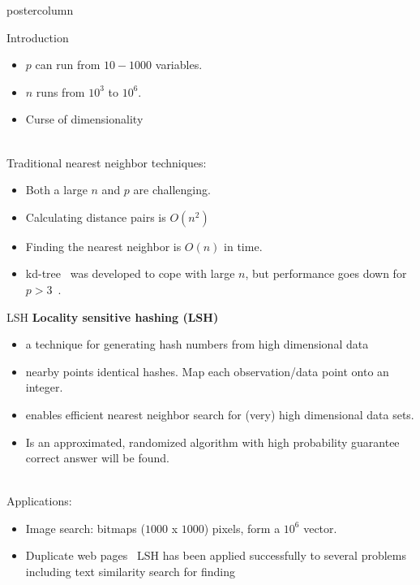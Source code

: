 \documentclass[final,hyperref={pdfpagelabels=false}]{beamer}
\begin{document}
\begin{frame}
\begin{columns}
\begin{column}{.49\textwidth}
\begin{beamercolorbox}[center,wd=\textwidth]{postercolumn}
\begin{minipage}[T]{.95\textwidth}
{\begin{block}{Introduction}
                \begin{itemize}
                \item $p$ can run from $10-1000$ variables. 
                \item $n$ runs from $10^3$ to $10^6$.
                \item Curse of dimensionality
              \end{itemize}            
            ~\\
            Traditional nearest neighbor techniques:            
              \begin{itemize}
             \item Both a large $n$ and $p$ are challenging.
             \item Calculating distance pairs is $O(n^2)$ 
             \item Finding the nearest neighbor is $O(n)$ in time.
             \item kd-tree~\citep{bentley1975} was developed to cope with large $n$, but performance goes
             down for $p > 3$~\citep{datar2004}. 
              \end{itemize}
            \end{block}
            \vfill
            \begin{block}{LSH}
{\bf Locality sensitive hashing (LSH)~\citep{datar2004}}
\begin{itemize} 
\item a technique for generating hash numbers
from high dimensional data
\item nearby points identical hashes. Map each observation/data point onto an integer.
\item enables efficient nearest neighbor search for (very) high dimensional data sets.
\item Is an approximated, randomized algorithm with high probability guarantee correct answer will be found. 
\end{itemize}~\\
  Applications:
  \begin{itemize}
    \item Image search: bitmaps ($1000$ x $1000$) pixels, form a $10^6$ vector.
    \item Duplicate web pages~\citep{slaney2008}
    LSH has been applied successfully to several problems including text similarity search for finding 
  \end{itemize}
            \end{block}
            \vfill
            
}
\end{minipage}
\end{beamercolorbox}
\end{column}
\end{columns}
\end{frame}
\end{document}
